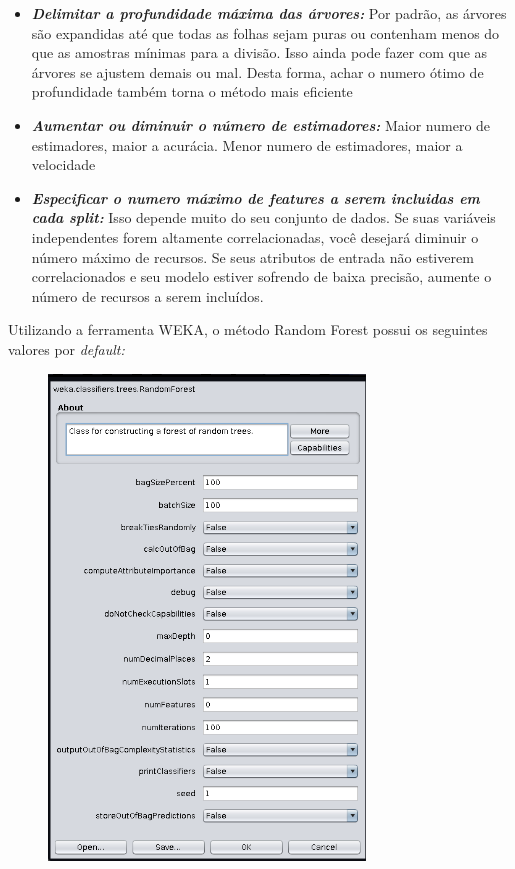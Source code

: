 \documentclass[12pt]{article}
\begin{document}
\begin{itemize}
	\item \textbf{\textit{Delimitar a profundidade máxima das árvores:}}
	      Por padrão, as árvores são expandidas até que todas as folhas sejam puras ou contenham menos do que as amostras mínimas para a divisão.
	      Isso ainda pode fazer com que as árvores se ajustem demais ou mal.
	      Desta forma, achar o numero ótimo de profundidade também torna o método mais eficiente
	\item \textbf{\textit{Aumentar ou diminuir o número de estimadores:}}
	      Maior numero de estimadores, maior a acurácia.
	      Menor numero de estimadores, maior a velocidade
	\item \textbf{\textit{Especificar o numero máximo de features a serem incluidas em cada split:}}
	      Isso depende muito do seu conjunto de dados.
	      Se suas variáveis independentes forem altamente correlacionadas, você desejará diminuir o número máximo de recursos.
	      Se seus atributos de entrada não estiverem correlacionados e seu modelo estiver sofrendo de baixa precisão, aumente o número de recursos a serem incluídos.
\end{itemize}
Utilizando a ferramenta WEKA, o método Random Forest possui os seguintes valores por \textit{default:}
\begin{figure}[h]
	\centering
	\includegraphics[width = 0.75\textwidth]{ibagens/atributos_weka.png}
\end{figure}
\end{document}
